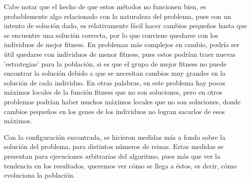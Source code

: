 \documentclass[letterpaper,11pt]{article} %
\begin{document}
  Cabe notar que el hecho de que estos métodos no funcionen bien, es probablemente algo relacionado con la naturaleza del problema, pues con un intento de solución dado, es relativamente fácil hacer cambios pequeños hasta que se encuentre una solución correcta, por lo que conviene quedarse con los individuos de mejor fitness. En problemas más complejos en cambio, podría ser útil quedarse con individuos de menor fitness, pues estos podrían traer nuevas 'estrategias' para la población, si es que el grupo de mejor fitness no puede encontrar la solución debido a que se necesitan cambios muy grandes en la solución de cada individuo. En otras palabras, en este problema hay pocos máximos locales de la función fitness que no son soluciones, pero en otros problemas podrían haber muchos máximos locales que no son soluciones, donde cambios pequeños en los genes de los individuos no logran sacarlos de esos máximos.
  
  \vspace{0.5cm}

  Con la configuración encontrada, se hicieron medidas más a fondo sobre la solución del problema, para distintos números de reinas. Estas medidas se presentan para ejecuciones arbitrarias del algoritmo, pues más que ver la tendencia en los resultados, queremos ver cómo se llega a éstos, es decir, cómo evoluciona la población.
\end{document}
